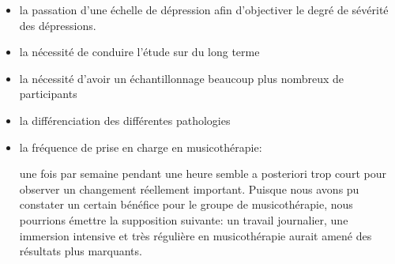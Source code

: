 \begin{itemize}

 \item la passation d'une échelle de
     dépression afin d'objectiver le degré de sévérité des
     dépressions.
\item  la nécessité de conduire l'étude sur du long terme
 \item   la nécessité
     d'avoir un échantillonnage beaucoup plus nombreux de 
     participants
  \item  la différenciation des différentes pathologies
     

 
 

  
 
  \item la fréquence de prise en charge en musicothérapie:
    
  une fois par semaine pendant une heure semble a posteriori
  trop court pour observer un changement réellement important. Puisque nous avons pu
  constater un certain bénéfice pour le groupe de musicothérapie, nous
  pourrions émettre la supposition suivante: un travail journalier,
 une immersion intensive et très
  régulière en
  musicothérapie aurait amené des résultats plus marquants.


 \end{itemize}

